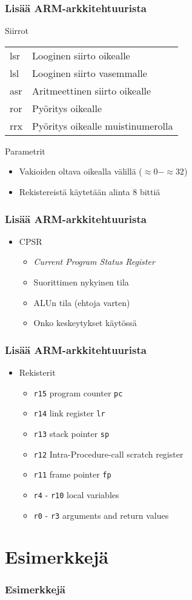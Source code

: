 \documentclass{beamer}
\begin{document}
\begin{frame}
    \frametitle{Lisää ARM-arkkitehtuurista}
    Siirrot
    \centering
    \begin{tabular}{p{} | p{}}
        \hline
        lsr & Looginen siirto oikealle \\
        lsl & Looginen siirto vasemmalle \\
        asr & Aritmeettinen siirto oikealle \\
        ror & Pyöritys oikealle \\
        rrx & Pyöritys oikealle muistinumerolla \\
    \end{tabular}
    
    Parametrit
    \begin{itemize}
        \item Vakioiden oltava oikealla välillä ($\approx 0 - \approx 32$)
        \item Rekistereistä käytetään alinta 8 bittiä
    \end{itemize}
\end{frame}
\begin{frame}
    \frametitle{Lisää ARM-arkkitehtuurista}
    \begin{itemize}
        \item CPSR
        \begin{itemize}
            \item \emph{Current Program Status Register}
            \item Suorittimen nykyinen tila
            \item ALUn tila (ehtoja varten)
            \item Onko keskeytykset käytössä
        \end{itemize}
    \end{itemize}
\end{frame}
\begin{frame}
    \frametitle{Lisää ARM-arkkitehtuurista}
    \begin{itemize}
        \item Rekisterit
        \begin{itemize}
            \item \texttt{r15} program counter \texttt{pc}
            \item \texttt{r14} link register \texttt{lr}
            \item \texttt{r13} stack pointer \texttt{sp}
            \item \texttt{r12} Intra-Procedure-call scratch register
            \item \texttt{r11} frame pointer \texttt{fp}
            \item \texttt{r4} - \texttt{r10} local variables
            \item \texttt{r0} - \texttt{r3} arguments and return values
        \end{itemize}
    \end{itemize}
\end{frame}
\section{Esimerkkejä}
\begin{frame}
    \frametitle{Esimerkkejä}
\end{frame}
\end{document}
